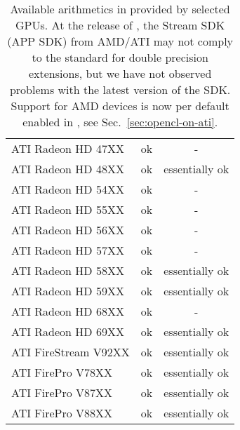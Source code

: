 \begin{table}[tb]
\begin{center}
\begin{tabular}{l|c|c}
ATI Radeon HD 47XX   & ok & - \\
ATI Radeon HD 48XX   & ok & essentially ok \\
ATI Radeon HD 54XX   & ok & - \\
ATI Radeon HD 55XX   & ok & - \\
ATI Radeon HD 56XX   & ok & - \\
ATI Radeon HD 57XX   & ok & - \\
ATI Radeon HD 58XX   & ok & essentially ok \\
ATI Radeon HD 59XX   & ok & essentially ok \\
ATI Radeon HD 68XX   & ok & - \\
ATI Radeon HD 69XX   & ok & essentially ok \\
ATI FireStream V92XX & ok & essentially ok \\
ATI FirePro V78XX    & ok & essentially ok \\
ATI FirePro V87XX    & ok & essentially ok \\
ATI FirePro V88XX    & ok & essentially ok \\
\end{tabular}
\caption{Available arithmetics in {\ViennaCL} provided by selected GPUs. At the
release of {\ViennaCLversion}, the Stream SDK (APP SDK) from AMD/ATI may not comply to
the {\OpenCL} standard for double precision extensions, but we have not observed
problems with the latest version of the SDK. Support for AMD devices is now
per default enabled in {\ViennaCL}, see Sec.~\ref{sec:opencl-on-ati}.}
\label{tab:double-precision-GPUs}
\end{center}
\end{table}
